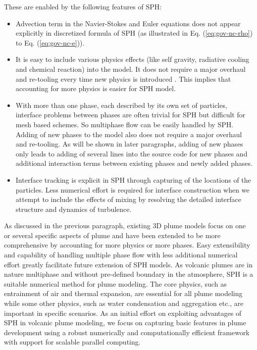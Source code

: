 These are enabled by the following features of SPH:
\begin{itemize}
\item Advection term in the Navier-Stokes and Euler equations does not appear explicitly in discretized formula of SPH (as illustrated in Eq. (\ref{eq:gov-nc-rho}) to Eq. (\ref{eq:gov-nc-e})).
\item It is easy to include various physics effects (like self gravity, radiative cooling and chemical reaction) into the model. It does not require a major overhaul and re-tooling every time new physics is introduced \citep{monaghan1995sph}. This implies that accounting for more physics is easier for SPH model.
\item With more than one phase, each described by its own set of particles, interface problems between phases are often trivial for SPH but difficult for mesh based schemes. So multiphase flow can be easily handled by SPH. Adding of new phases to the model also does not require a major overhaul and re-tooling. As will be shown in later paragraphs, adding of new phases only leads to adding of several lines into the source code for new phases and additional interaction terms between existing phases and newly added phases.
\item Interface tracking is explicit in SPH through capturing of the locations of the particles. Less numerical effort is required for interface construction when we attempt to include the effects of mixing by resolving the detailed interface structure and dynamics of turbulence.
\end{itemize}

As discussed in the previous paragraph, existing 3D plume models focus on one or several specific aspects of plume and have been extended to be more comprehensive by accounting for more physics or more phases. Easy extensibility and capability of handling multiple phase flow with less additional numerical effort greatly facilitate future extension of SPH models. As volcanic plumes are in nature multiphase and without pre-defined boundary in the atmosphere, SPH is a suitable numerical method for plume modeling. The core physics, such as entrainment of air and thermal expansion, are essential for all plume modeling while some other physics, such as water condensation and aggregation etc., are important in specific scenarios. As an initial effort on exploiting advantages of SPH in volcanic plume modeling, we focus on capturing basic features in plume development using a robust numerically and computationally efficient framework with support for scalable parallel computing. %


